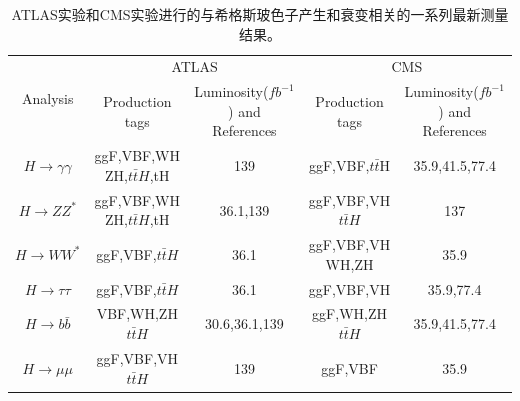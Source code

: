 \begin{table}[ht]
\caption{ATLAS实验和CMS实验进行的与希格斯玻色子产生和衰变相关的一系列最新测量结果。}
\begin{center}
\begin{adjustbox}{width=\columnwidth,center}
\begin{tabular}{c|cc|cc}
    \hline
    \hline
    \multirow{2}{*}{Analysis} & \multicolumn{2}{c|}{ATLAS} & \multicolumn{2}{c}{CMS} \\
    & Production tags & \thead{Luminosity($fb^{-1}$) \\ and References} & Production tags & \thead{Luminosity($fb^{-1}$) \\ and References} \\
    \hline
    $H\rightarrow\gamma\gamma$ & \thead{ggF,VBF,WH\\ZH,$t\bar{t}H$,tH} & 139\cite{ATLASHIGGS1} & ggF,VBF,$t\bar{t}$H & 35.9\cite{CMSHIGGS2},41.5\cite{CMSHIGGS3},77.4\cite{CMSHIGGS1} \\
    \hline
    $H\rightarrow ZZ^*$ & \thead{ggF,VBF,WH\\ZH,$t\bar{t}H$,tH} & 36.1\cite{ATLASHIGGS5,AHbb10},139\cite{ATLASHIGGS2} & \thead{ggF,VBF,VH\\$t\bar{t}H$}& 137\cite{CMSHIGGS4}  \\
     \hline
    $H\rightarrow WW^*$ & ggF,VBF,$t\bar{t}H$ & 36.1\cite{ATLASHIGGS3,ATLASHIGGS5,AHbb10} & \thead{ggF,VBF,VH\\WH,ZH} & 35.9\cite{CMSHIGGS5}  \\
     \hline
    $H\rightarrow \tau\tau$ & ggF,VBF,$t\bar{t}H$ & 36.1\cite{ATLASHIGGS4,ATLASHIGGS5,AHbb10} & ggF,VBF,VH & 35.9\cite{CMSHIGGS6},77.4\cite{CMSHIGGS7}   \\
     \hline
    $H\rightarrow b\bar{b}$ & \thead{VBF,WH,ZH\\$t\bar{t}H$}  & 30.6\cite{AHbb6},36.1\cite{AHbb7,AHbb8},139\cite{AHbb5} & \thead{ggF,WH,ZH\\$t\bar{t}H$} & 35.9\cite{CHbb3},41.5\cite{CHbb2,CHbb4},77.4\cite{CHbb1} \\
     \hline
    $H\rightarrow \mu\mu$ & \thead{ggF,VBF,VH\\$t\bar{t}H$} & 139\cite{ATLASHIGGS6} & ggF,VBF& 35.9\cite{CMSHIGGS10}  \\
    \hline
    \hline
\end{tabular}
\end{adjustbox}
\end{center}
\label{tab:ACHIGGS}
\end{table}

